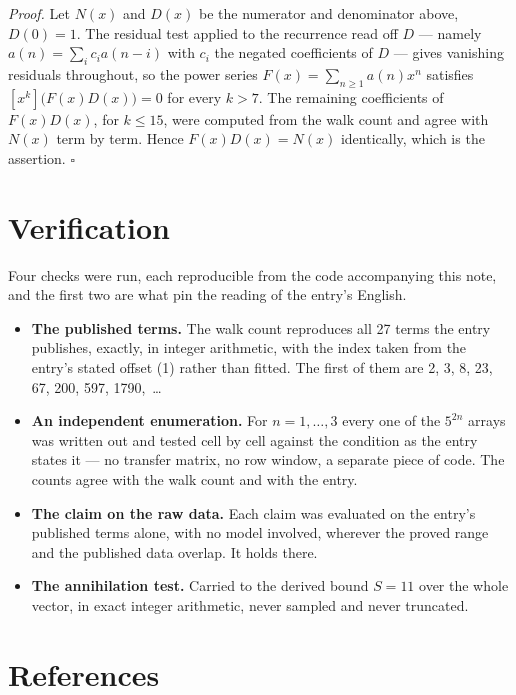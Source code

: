 \documentclass[11pt]{article}
\theoremstyle{definition}
\begin{document}
{\itshape Proof.} Let $N(x)$ and $D(x)$ be the numerator and denominator above, $D(0)=1$. The residual test applied to the recurrence read off $D$ --- namely $a(n) = \sum_i c_i a(n-i)$ with $c_i$ the negated coefficients of $D$ --- gives vanishing residuals throughout, so the power series $F(x)=\sum_{n\ge 1}a(n)x^n$ satisfies $[x^k]\bigl(F(x)D(x)\bigr) = 0$ for every $k > 7$. The remaining coefficients of $F(x)D(x)$, for $k \le 15$, were computed from the walk count and agree with $N(x)$ term by term. Hence $F(x)D(x) = N(x)$ identically, which is the assertion. $\square$

\section{Verification}

Four checks were run, each reproducible from the code accompanying this note, and the first two are what pin the reading of the entry's English.

\begin{itemize}

\item {\bfseries The published terms.} The walk count reproduces all 27 terms the entry publishes, exactly, in integer arithmetic, with the index taken from the entry's stated offset (1) rather than fitted. The first of them are 2, 3, 8, 23, 67, 200, 597, 1790,~\dots

\item {\bfseries An independent enumeration.} For $n = 1,\dots,3$ every one of the $5^{2n}$ arrays was written out and tested cell by cell against the condition as the entry states it --- no transfer matrix, no row window, a separate piece of code. The counts agree with the walk count and with the entry.

\item {\bfseries The claim on the raw data.} Each claim was evaluated on the entry's published terms alone, with no model involved, wherever the proved range and the published data overlap. It holds there.

\item {\bfseries The annihilation test.} Carried to the derived bound $S = 11$ over the whole vector, in exact integer arithmetic, never sampled and never truncated.

\end{itemize}

\section{References}
\end{document}
